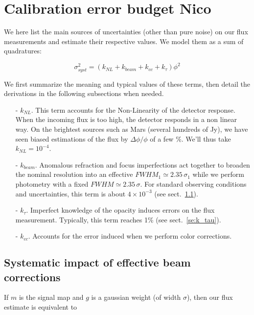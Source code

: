 
\section{Calibration error budget {\color{blue} Nico}}
\label{se:error}

We here list the main sources of uncertainties (other than pure noise) on our flux measurements and
estimate their respective values. We model them as a sum of quadratures:

\begin{equation}
\sigma_{syst}^2 = (k_{NL} + k_{beam} + k_{cc} + k_\tau)\phi^2
\end{equation}

We first summarize the meaning and typical values of these terms, then detail
the derivations in the following subsections when needed.

\begin{itemize}
\item[-] $k_{NL}$. This term accounts for the Non-Linearity of the detector response. When the incoming flux is too
  high, the detector responds in a non linear way. On the brightest sources
  such as Mars (several hundreds of Jy), we have seen biased estimations of the
  flux by $\Delta\phi/\phi$ of a few \%. We'll thus take $k_{NL}=10^{-4}$.
\item[-] $k_{beam}$. Anomalous refraction and focus imperfections act together to
  broaden the nominal resolution into an effective $FWHM_1 \simeq 2.35\,\sigma_1$ while we perform
  photometry with a fixed $FWHM \simeq 2.35\,\sigma$. For standard observing
  conditions and uncertainties, this term is about $4\times 10^{-3}$ (see
  sect.~\ref{se:k_beam}).
\item[-] $k_\tau$. Imperfect knowledge of the opacity induces errors on the flux
  measurement. Typically, this term reaches 1\% (see sect.~\ref{se:k_tau}).
\item[-] $k_{cc}$. Accounts for the error induced when we perform color
  corrections. 
\end{itemize}


\subsection{Systematic impact of effective beam corrections}
\label{se:k_beam}

 If $m$ is the signal map and $g$ is
  a gaussian weight (of width $\sigma$), then our flux estimate is equivalent to

